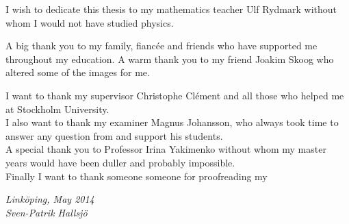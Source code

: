 \begin{acknowledgments}
I wish to dedicate this thesis to my mathematics teacher Ulf Rydmark without whom I would not have studied physics.

A big thank you to my family, fiancée and friends who have supported me throughout my education. A warm thank you to my friend Joakim Skoog who altered some of the images for me.


I want to thank my supervisor Christophe Clément and all those who helped me at Stockholm University. \\
I also want to thank my examiner Magnus Johansson, who always took time to answer any question from and support his students. \\ 
A special thank you to Professor Irina Yakimenko without whom my master years would have been duller and probably impossible.\\
Finally I want to thank someone someone for proofreading my

  \addvspace{1em}
  \begin{flushright}
    \textit{%
      Linköping, May 2014\\
      Sven-Patrik Hallsjö%
    }
  \end{flushright}
\end{acknowledgments}

